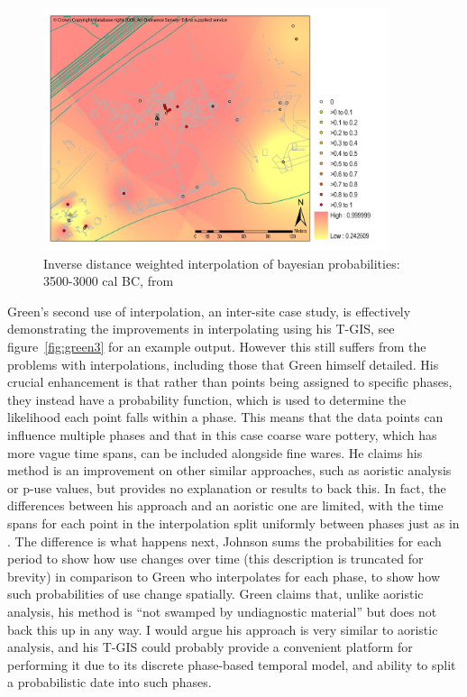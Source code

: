 \begin{figure}
\centering
	\includegraphics[width=0.9\textwidth,height=0.9\textheight,keepaspectratio=true]{figures/green2}
  \caption{Inverse distance weighted interpolation of bayesian probabilities: 3500-3000 cal BC, from \cite{Green:2008fk}}
  \label{fig:green2}
\end{figure}

Green's second use of interpolation, an inter-site case study, is effectively demonstrating the improvements in interpolating using his T-GIS, see figure~\ref{fig:green3} for an example output. However this still suffers from the problems with interpolations, including those that Green himself detailed. His crucial enhancement is that rather than points being assigned to specific phases, they instead have a probability function, which is used to determine the likelihood each point falls within a phase. This means that the data points can influence multiple phases and that in this case coarse ware pottery, which has more vague time spans, can be included alongside fine wares. He claims his method is an improvement on other similar approaches, such as aoristic analysis or p-use values, but provides no explanation or results to back this. In fact, the differences between his approach and an aoristic one are limited, with the time spans for each point in the interpolation split uniformly between phases just as in \citet[35]{Johnson:2004fk}. The difference is what happens next, Johnson sums the probabilities for each period to show how use changes over time (this description is truncated for brevity) in comparison to Green who interpolates for each phase, to show how such probabilities of use change spatially. Green claims that, unlike aoristic analysis, his method is ``not swamped by undiagnostic material'' \citep[224]{Green:2008fk} but does not back this up in any way. I would argue his approach is very similar to aoristic analysis, and his T-GIS could probably provide a convenient platform for performing it due to its discrete phase-based temporal model, and ability to split a probabilistic date into such phases. 

